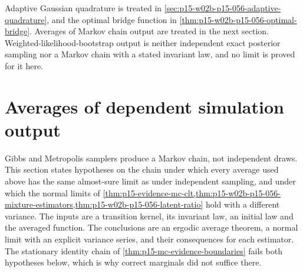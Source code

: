 Adaptive Gaussian quadrature is treated in
\cref{sec:p15-w02b-p15-056-adaptive-quadrature}, and the optimal bridge
function in \cref{thm:p15-w02b-p15-056-optimal-bridge}. Averages of Markov
chain output are treated in the next section. Weighted-likelihood-bootstrap
output is neither independent exact posterior sampling nor a Markov chain
with a stated invariant law, and no limit is proved for it here.

\section{Averages of dependent simulation output}
\label{sec:p15-w02b-p15-056-dependent-averages}

Gibbs and Metropolis samplers produce a Markov chain, not independent
draws. This section states hypotheses on the chain under which every
average used above has the same almost-sure limit as under independent
sampling, and under which the normal limits of
\cref{thm:p15-evidence-mc-clt,thm:p15-w02b-p15-056-mixture-estimators,thm:p15-w02b-p15-056-latent-ratio}
hold with a different variance. The inputs are a transition kernel, its
invariant law, an initial law and the averaged function. The conclusions
are an ergodic average theorem, a normal limit with an explicit variance
series, and their consequences for each estimator. The stationary
identity chain of \cref{thm:p15-mc-evidence-boundaries} fails both
hypotheses below, which is why correct marginals did not suffice there.

